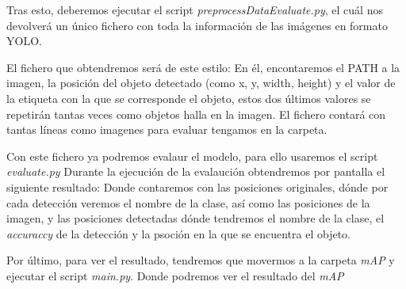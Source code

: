 
Tras esto, deberemos ejecutar el script \textit{preprocessDataEvaluate.py}, el cuál nos devolverá un único fichero con toda la información de las imágenes en formato YOLO.

El fichero que obtendremos será de este estilo:
En él, encontaremos el PATH a la imagen, la posición del objeto detectado (como x, y, width, height) y el valor de la etiqueta con la que se corresponde el objeto, estos dos últimos valores se repetirán tantas veces como objetos halla en la imagen. El fichero contará con tantas líneas como imagenes para evaluar tengamos en la carpeta.

Con este fichero ya podremos evalaur el modelo, para ello usaremos el script \textit{evaluate.py}
Durante la ejecución de la evalaución obtendremos por pantalla el siguiente resultado:
Donde contaremos con las posiciones originales, dónde por cada detección veremos el nombre de la clase, así como las posiciones de la imagen, y las posiciones detectadas dónde tendremos el nombre de la clase, el \textit{accuraccy} de la detección y la psoción en la que se encuentra el objeto.

Por último, para ver el resultado, tendremos que movermos a la carpeta \textit{mAP} y ejecutar el script \textit{main.py}.
Donde podremos ver el resultado del \textit{mAP}
